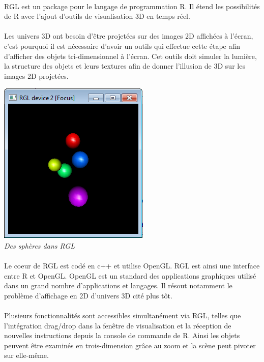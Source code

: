 \paragraph{}
RGL est un package pour le langage de programmation R. Il étend les possibilités de R avec l'ajout d'outils de visualisation 3D en temps réel.
\paragraph{}
Les univers 3D ont besoin d’être projetées sur des images 2D affichées à l’écran, c'est pourquoi il est nécessaire d'avoir un outils qui effectue cette étape afin d'afficher des objets tri-dimensionnel à l’écran. Cet outils doit simuler la lumière, la structure des objets et leurs textures afin de donner l'illusion de 3D sur les images 2D projetées.
\begin{center}
\includegraphics[scale=0.7]{screen_rgl2.png}\\
\textit{Des sphères dans RGL}
\end{center}


\paragraph{}
Le coeur de RGL est codé en c++ et utilise OpenGL. RGL est ainsi une interface entre R et OpenGL. OpenGL est un standard des applications graphiques utilisé dans un grand nombre d'applications et langages. Il résout notamment le problème d'affichage en 2D d'univers 3D cité plus tôt. 
\paragraph{}
Plusieurs fonctionnalités sont accessibles simultanément via RGL, telles que l’intégration drag/drop dans la fenêtre de visualisation et la réception de nouvelles instructions depuis la console de commande de R. Ainsi les objets peuvent être examinés en trois-dimension grâce au zoom et la scène peut pivoter sur elle-même.

